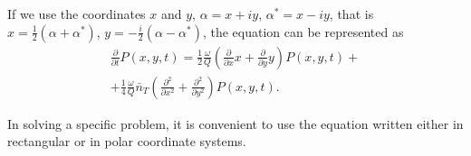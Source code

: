If we use the coordinates  $x$ and $y$, 
$\alpha = x + i y$, $\alpha^{*} = x - i y$, that is 
$x = \frac{1}{2}\left(\alpha + \alpha^{*}\right)$,  
$y = - \frac{i}{2}\left(\alpha - \alpha^{*}\right)$, the equation can be represented as 
\begin{eqnarray}
\frac{\partial}{\partial t}P\left(x, y, t\right) = 
\frac{1}{2}\frac{\omega}{Q}
\left(
\frac{\partial}{\partial x} x +
\frac{\partial}{\partial y} y
\right)
P\left(x, y, t\right) +
\nonumber \\
+
\frac{1}{4}
\frac{\omega}{Q}\bar{n}_T
\left(
\frac{\partial^2}{\partial x^2} +
\frac{\partial^2}{\partial y^2}
\right)
P\left(x, y, t\right).
\label{eqCh2_77a}
\end{eqnarray}

In solving a specific problem, it is convenient to use the equation written either in rectangular or in polar coordinate systems.